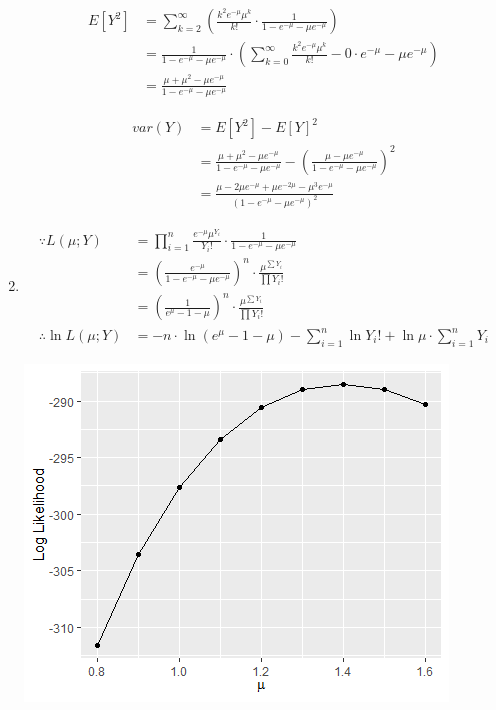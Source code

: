 \documentclass[11pt]{article}
\begin{document}
\begin{enumerate}
\begin{equation*}
\begin{split}
E[Y^2] &= \sum\limits_{k=2}^{\infty} \left( 
\frac{k^2e^{-\mu}\mu^k}{k!} \cdot \frac{1}{1-e^{-\mu}-\mu e^{-\mu}} \right) \\
&= \frac{1}{1-e^{-\mu}-\mu e^{-\mu}} \cdot \left(
 \sum\limits_{k=0}^{\infty} \frac{k^2e^{-\mu}\mu^k}{k!} - 0\cdot e^{-\mu}-\mu e^{-\mu} \right) \\
&= \frac{\mu+\mu^2-\mu e^{-\mu}}{1-e^{-\mu}-\mu e^{-\mu}}
\end{split}
\end{equation*}

\begin{equation*}
\begin{split}
var(Y) &= E[Y^2] - E[Y]^2 \\
&= \frac{\mu+\mu^2-\mu e^{-\mu}}{1-e^{-\mu}-\mu e^{-\mu}} - \left(
\frac{\mu-\mu e^{-\mu}}{1-e^{-\mu}-\mu e^{-\mu}} \right)^2 \\
&= \frac{\mu-2\mu e^{-\mu}+\mu e^{-2\mu}-\mu^3e^{-\mu}}{(1-e^{-\mu}-\mu e^{-\mu})^2}
\end{split}
\end{equation*}

\item 
\begin{equation*}
\begin{split}
\because L(\mu; Y) &= \prod\limits_{i=1}^n \frac{e^{-\mu}\mu^{Y_i}}{Y_i!} \cdot \frac{1}{1-e^{-\mu}-\mu e^{-\mu}} \\
&= \left(\frac{e^{-\mu}}{1-e^{-\mu}-\mu e^{-\mu}}\right)^n \cdot \frac{\mu^{\sum Y_i}}
{\prod Y_i!} \\
&= \left(\frac{1}{e^{\mu}-1-\mu}\right)^n \cdot \frac{\mu^{\sum Y_i}}
{\prod Y_i!} \\
\therefore \ln L(\mu; Y) &= -n \cdot \ln (e^\mu - 1 - \mu) 
- \sum\limits_{i=1}^n \ln Y_i! + \ln \mu \cdot \sum\limits_{i=1}^n Y_i
\end{split}
\end{equation*}

\begin{center}
  \includegraphics[width=0.7\linewidth]{Q5.png}
\end{center}


\end{enumerate}
\end{document}
